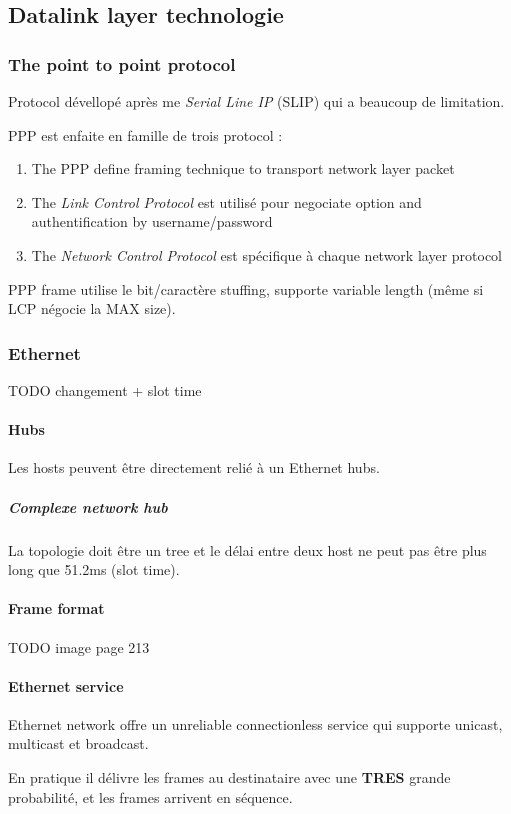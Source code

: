 \subsection{Datalink layer technologie}

\subsubsection{The point to point protocol}
Protocol dévellopé après me \textit{Serial Line IP} (SLIP) qui a beaucoup de limitation.

PPP est enfaite en famille de trois protocol :
\begin{enumerate}
    \item The PPP define framing technique to transport network layer packet
    \item The \textit{Link Control Protocol} est utilisé pour negociate option and authentification by username/password
    \item The \textit{Network Control Protocol} est spécifique à chaque network layer protocol
\end{enumerate}

PPP frame utilise le bit/caractère stuffing, supporte variable length (même si LCP négocie la MAX size).

\subsubsection{Ethernet}
TODO changement + slot time

\paragraph{Hubs}
Les hosts peuvent être directement relié à un Ethernet hubs.
\subparagraph{Complexe network hub} La topologie doit être un tree et le délai entre
deux host ne peut pas être plus long que 51.2ms (slot time).

\paragraph{Frame format}
TODO image page 213

\paragraph{Ethernet service}
Ethernet network offre un unreliable connectionless service qui supporte unicast, multicast et
broadcast.

En pratique il délivre les frames au destinataire avec une \textbf{TRES} grande probabilité,
et les frames arrivent en séquence.

